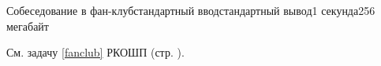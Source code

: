 \begin{problem}[(Парников В.\,В.)]{Собеседование в фан-клуб}{стандартный ввод}{стандартный вывод}{1 секунда}{256 мегабайт}

См. задачу \ref{fanclub} РКОШП (стр. \pageref{fanclub}).
\end{problem}

